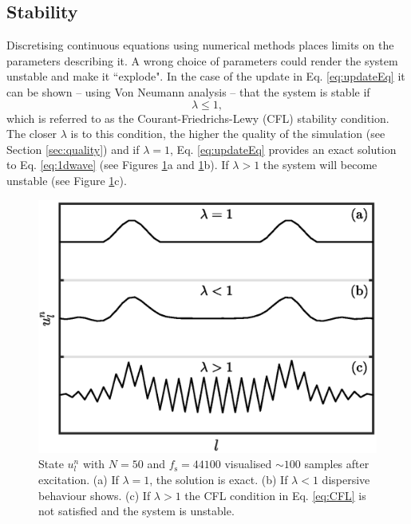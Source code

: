 \subsection{Stability}\label{sec:stability}
Discretising continuous equations using numerical methods places limits on the parameters describing it. A wrong choice of parameters could render the system unstable and make it ``explode". In the case of the update in Eq. \eqref{eq:updateEq} it can be shown -- using Von Neumann analysis \cite{Strikwerda1989} -- that the system is stable if
\begin{equation}\label{eq:CFL}
    \lambda \leq 1,
\end{equation}
which is referred to as the Courant-Friedrichs-Lewy (CFL) stability condition. The closer $\lambda$ is to this condition, the higher the quality of the simulation (see Section \ref{sec:quality}) and if $\lambda = 1$, Eq. \eqref{eq:updateEq} provides an exact solution to Eq. \eqref{eq:1dwave} %
(see Figures \ref{fig:dispersion}a and \ref{fig:dispersion}b). If $\lambda > 1$ the system will become unstable (see Figure \ref{fig:dispersion}c).
\begin{figure}[t]
    \centering
    \includegraphics[width=0.8\columnwidth]{Figures/dispersionCompact.eps}
    \caption{State $u_l^n$ with $N = 50$ and $f_\text{s} = 44100$ visualised $\sim\!100$ samples after excitation. (a) If $\lambda = 1$, the solution is exact. (b) If $\lambda < 1$ dispersive behaviour shows. (c) If $\lambda > 1$ the CFL condition in Eq. \eqref{eq:CFL} is not satisfied and the system is unstable.
    \label{fig:dispersion}}
\end{figure}

